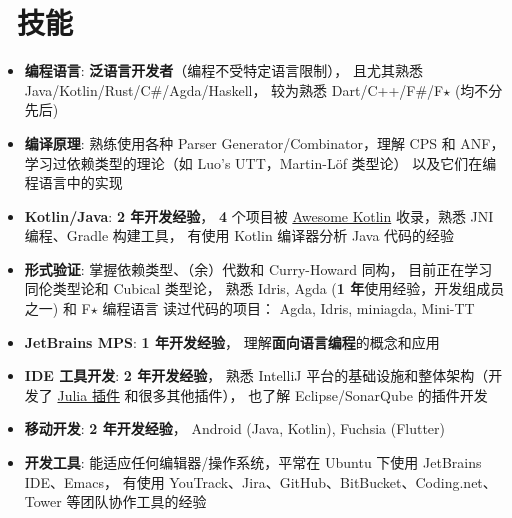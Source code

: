 \documentclass{resume}
\begin{document}
\section{\faCogs\ 技能}
\begin{itemize}[parsep=0.25ex]
  \item \textbf{编程语言}:
    \textbf{泛语言开发者}（编程不受特定语言限制），
    且尤其熟悉 Java/Kotlin/Rust/C\#/Agda/Haskell，
    较为熟悉 Dart/C++/F\#/F$\star$ (均不分先后)

  \item \textbf{编译原理}:
    熟练使用各种 Parser Generator/Combinator，理解 CPS 和 ANF，
    学习过依赖类型的理论（如 Luo's UTT，Martin-Löf 类型论）
    以及它们在编程语言中的实现

  \item \textbf{Kotlin/Java}:
    \textbf{2 年开发经验}，
    \textbf{4} 个项目被
    \href{https://kotlin.link/?q=ice} {Awesome Kotlin}
    收录，熟悉 JNI 编程、Gradle 构建工具，
    有使用 Kotlin 编译器分析 Java 代码的经验

  \item \textbf{形式验证}:
    掌握依赖类型、（余）代数和 Curry-Howard 同构，
    目前正在学习同伦类型论和 Cubical 类型论，
    熟悉 Idris, Agda (\textbf{1 年}使用经验，开发组成员之一)
    和 F$\star$ 编程语言
    \subitem 读过代码的项目： Agda, Idris, miniagda, Mini-TT

  \item \textbf{JetBrains MPS}:
    \textbf{1 年开发经验}，
    理解\textbf{面向语言编程}的概念和应用

  \item \textbf{IDE 工具开发}:
    \textbf{2 年开发经验}，
    熟悉 IntelliJ 平台的基础设施和整体架构（开发了
      \href{https://plugins.jetbrains.com/plugin/10413-julia}
           {Julia 插件} 和很多其他插件），
    也了解 Eclipse/SonarQube 的插件开发

  \item \textbf{移动开发}:
    \textbf{2 年开发经验}，
    Android (Java, Kotlin), Fuchsia (Flutter)

  \item \textbf{开发工具}:
    能适应任何编辑器/操作系统，平常在 Ubuntu 下使用 JetBrains IDE、Emacs，
    有使用 YouTrack、Jira、GitHub、BitBucket、Coding.net、Tower 等团队协作工具的经验
\end{itemize}

\end{document}
